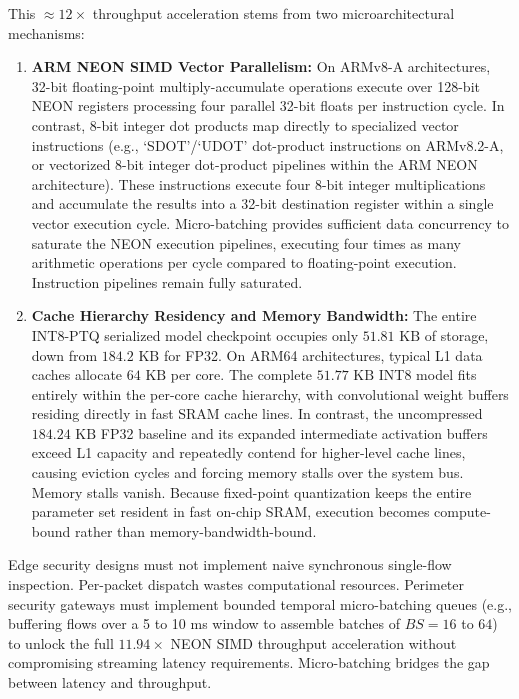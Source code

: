 \documentclass[conference]{IEEEtran}
\begin{document}
This $\approx 12\times$ throughput acceleration stems from two microarchitectural mechanisms:
\begin{enumerate}
    \item \textbf{ARM NEON SIMD Vector Parallelism:} On ARMv8-A architectures, 32-bit floating-point multiply-accumulate operations execute over 128-bit NEON registers processing four parallel 32-bit floats per instruction cycle. In contrast, 8-bit integer dot products map directly to specialized vector instructions (e.g., `SDOT'/`UDOT' dot-product instructions on ARMv8.2-A, or vectorized 8-bit integer dot-product pipelines within the ARM NEON architecture). These instructions execute four 8-bit integer multiplications and accumulate the results into a 32-bit destination register within a single vector execution cycle. Micro-batching provides sufficient data concurrency to saturate the NEON execution pipelines, executing four times as many arithmetic operations per cycle compared to floating-point execution. Instruction pipelines remain fully saturated.
    \item \textbf{Cache Hierarchy Residency and Memory Bandwidth:} The entire INT8-PTQ serialized model checkpoint occupies only $51.81\text{ KB}$ of storage, down from $184.2\text{ KB}$ for FP32. On ARM64 architectures, typical L1 data caches allocate $64\text{ KB}$ per core. The complete $51.77\text{ KB}$ INT8 model fits entirely within the per-core cache hierarchy, with convolutional weight buffers residing directly in fast SRAM cache lines. In contrast, the uncompressed $184.24\text{ KB}$ FP32 baseline and its expanded intermediate activation buffers exceed L1 capacity and repeatedly contend for higher-level cache lines, causing eviction cycles and forcing memory stalls over the system bus. Memory stalls vanish. Because fixed-point quantization keeps the entire parameter set resident in fast on-chip SRAM, execution becomes compute-bound rather than memory-bandwidth-bound.
\end{enumerate}

Edge security designs must not implement naive synchronous single-flow inspection. Per-packet dispatch wastes computational resources. Perimeter security gateways must implement bounded temporal micro-batching queues (e.g., buffering flows over a 5 to 10 ms window to assemble batches of $BS = 16$ to $64$) to unlock the full $11.94\times$ NEON SIMD throughput acceleration without compromising streaming latency requirements. Micro-batching bridges the gap between latency and throughput.
\end{document}

